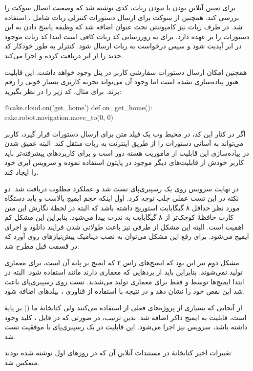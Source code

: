 \documentclass{cake-classes/short-report-fa}
\newcommand{\کیک}{مجموعهٔ کیکْ روباتیک}
\begin{document}
برای تعیین آنلاین بودن یا نبودن ربات، کدی نوشته شد که وضعیت اتصال سوکت را بررسی کند. همچنین از سوکت برای ارسال دستورات کنترلی ربات شامل ،  استفاده شد. در طرف ربات نیز کامپوننتی تحت عنوان  اضافه شد که وظیفه پاسخ دادن به این دستورات را بر عهده دارد. برای به روزرسانی کد ربات کافی است ابتدا کد ربات موجود در ابر آپدیت شود و سپس درخواست  به ربات ارسال شود. کنترلر به طور خودکار کد جدید را از ابر دریافت کرده و اجرا می‌کند.

همچنین امکان ارسال دستورات سفارشی کاربر در پنل وجود خواهد داشت. این قابلیت هنوز پیاده‌سازی نشده است اما وجود آن می‌تواند تجربه کاربری بسیار خوبی را رقم بزند. برای مثال، کد زیر را در نظر بگیرید:
\begin{python}
@cake.cloud.on('get_home')
def on_get_home():
	cake.robot.navigation.move_to(0, 0)
\end{python}
اگر در کنار این کد، در محیط وب یک فیلد متن برای ارسال دستورات قرار گیرد، کاربر می‌تواند به آسانی دستورات را از طریق اینترنت به ربات منتقل کند. البته عمیق شدن در پیاده‌سازی این قابلیت از ماموریت هسته دور است و برای کاربردهای پیشرفته‌تر باید کاربر خودش از قابلیت‌های دیگر موجود در پایتون استفاده نموده و سرویس ابری خود را ایجاد کند.

در نهایت سرویس  روی یک رسپبری‌پای تست شد و عملکرد مطلوب دریافت شد. دو نکته در این تست عملی جلب توجه کرد. اول اینکه حجم ایمیج  بالاست و باید دستگاه مورد نظر حداقل ۸ گیگابایت استوریج داشته باشد که البته در لحظهٔ نگارش این متن کارت حافظهٔ کوچک‌تر از ۸ گیگابایت به ندرت پیدا می‌شود. بنابراین این مشکل کم اهمیت است. البته این مشکل از طرفی نیز باعث طولانی شدن فرایند دانلود و اجرای ایمیج می‌شود. برای رفع این مشکل می‌توان به نصب دینامیک پیش‌نیازهای  روی آورد که در قسمت قبل مطرح شد.

مشکل دوم نیز این بود که ایمیج‌های راس ۲ که ایمیج  بر پایهٔ آن است، برای معماری  تولید نمی‌شوند. بنابراین باید از بردهایی که معماری  دارند مانند  استفاده شود. البته در ابتدا ایمیج‌ها توسط  و فقط برای معماری  تولید می‌شدند. تست روی رسپبری‌پای باعث شد این نقص خود را نشان دهد و در نتیجه با استفاده از فناوری ، بیلدهای  اضافه شود.

از آنجایی که بسیاری از پروژه‌های فعلی از  استفاده می‌کنند ولی کتابخانهٔ ما () بر پایهٔ  است، قابلیت  به ایمیج داکر اضافه شد. بدین ترتیب، در صورتی که در فایل ، کلید  وجود داشته باشد، سرویس  نیز اجرا می‌شود. این قابلیت در یک رسپبری‌پای با موفقیت تست شد.

تغییرات اخیر کتابخانهٔ  در مستندات آنلاین آن که در روزهای اول نوشته شده بودند منعکس شد.
\end{document}
